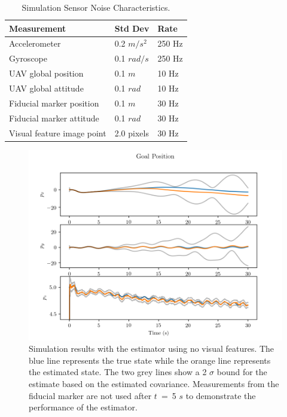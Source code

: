\begin{table}[h!]
  \begin{center}
    \caption{Simulation Sensor Noise Characteristics.}
    \label{tab:sim_meas_noise}
    \begin{tabular}{l|l|l}
      \textbf{Measurement} & \textbf{Std Dev} & \textbf{Rate} \\
      \hline
      Accelerometer & 0.2 $m/s^2$ & 250 Hz \\
      Gyroscope & 0.1 $rad/s$ & 250 Hz \\
      UAV global position & 0.1 $m$ & 10 Hz \\
      UAV global attitude & 0.1 $rad$ & 10 Hz \\
      Fiducial marker position & 0.1 $m$ & 30 Hz \\
      Fiducial marker attitude & 0.1 $rad$ & 30 Hz \\
      Visual feature image point & 2.0 pixels & 30 Hz \\
    \end{tabular}
  \end{center}
\end{table}

\begin{figure}
  \centering
  \includegraphics[scale=0.5]{plots/no_lms_gp.png}
  \caption{Simulation results with the estimator using no visual
  features. The blue line represents the true state while the orange line
  represents the estimated state. The two grey lines show a 2 $\sigma$ bound for
  the estimate based on the estimated covariance. Measurements from the fiducial
  marker are not used after $t$~=~5
$s$ to demonstrate the performance of the estimator.}
  \label{fig:no_lms_gp}
\end{figure}

